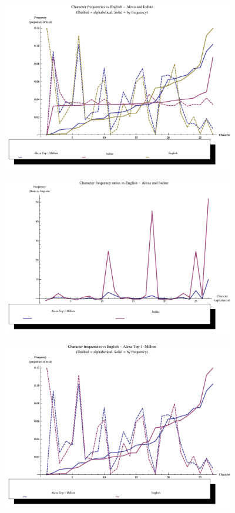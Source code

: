 \documentclass[12pt]{report}
\theoremstyle{remark}
\theoremstyle{definition}
\theoremstyle{definition}
\theoremstyle{definition}
\begin{document}
\begin{figure}
\centering
\includegraphics[width=4in]{figures/alexa_iodine_v_english-a.pdf}
\end{figure}
\begin{figure}
\centering
\includegraphics[width=4in]{figures/alexa_iodine_v_english-r.pdf}
\end{figure}
\begin{figure}
\centering
\includegraphics[width=4in]{figures/alexa_v_english-a.pdf}
\end{figure}
\end{document}
